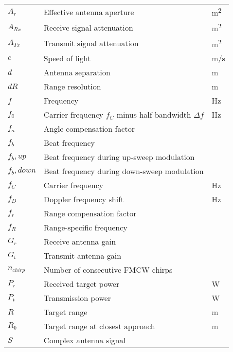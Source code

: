 \begin{listofsymbols}

\keepXColumns
\setlength{\tabcolsep}{0pt}
\begin{tabularx}{\textwidth}{%
  >{\setlength{\hsize}{3cm}\raggedright\arraybackslash}X%
  X%
  >{\setlength{\hsize}{2cm}\raggedright\arraybackslash}X%
}

$A_r$ & Effective antenna aperture          & \si{m^2}\\
$A_{Rx}$ & Receive signal attenuation          & \si{m^2}\\
$A_{Tx}$ & Transmit signal attenuation          & \si{m^2}\\
$c$   & Speed of light                      & \si{m/s} \\
$d$   & Antenna separation                  & \si{m} \\
$dR$  & Range resolution                    & \si{m} \\
$f$ &  Frequency & \si{Hz}\\
$f_0$ & Carrier frequency $f_C$ minus half bandwidth $\Delta f$& \si{Hz}\\
$f_a$ & Angle compensation factor           & \\
$f_b$ & Beat frequency & \\
$f_b,up$ & Beat frequency during up-sweep modulation & \\
$f_b,down$ & Beat frequency during down-sweep modulation & \\
$f_C$ & Carrier frequency                   & \si{Hz}\\
$f_D$ & Doppler frequency shift             & \si{Hz}\\
$f_r$ & Range compensation factor           & \\
$f_R$ & Range-specific frequency            & \\
$G_r$ & Receive antenna gain                & \\
$G_t$ & Transmit antenna gain               & \\
$n_{chirp}$ & Number of consecutive FMCW chirps & \\
$P_r$ & Received target power               & \si{W} \\
$P_t$ & Transmission power                  & \si{W} \\
$R$   & Target range                        & \si{m} \\
$R_0$ & Target range at closest approach    & \si{m} \\
$S$ & Complex antenna signal              & \\

\end{tabularx}
\end{listofsymbols}
